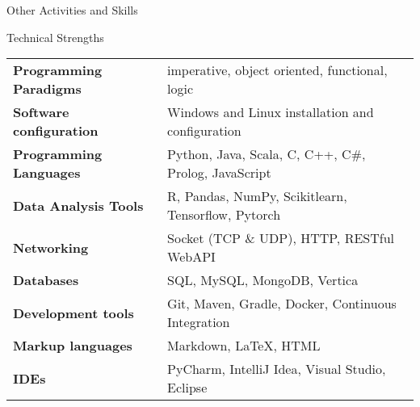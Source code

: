 \documentclass{resume} %
\begin{document}
\begin{rSection}{Other Activities and Skills}
        \begin{rNoListSubsection}{Technical Strengths}{}{}{}
            \begin{tabular}{ @{} >{\bfseries}l @{\hspace{6ex}} l }
                Programming Paradigms	& imperative, object oriented, functional, logic\\
                Software configuration 	& Windows and Linux installation and configuration\\
                Programming Languages 	& Python, Java, Scala, C, C++, C\#, Prolog, JavaScript\\
                Data Analysis Tools		& R, Pandas, NumPy, Scikitlearn, Tensorflow, Pytorch\\
                Networking 				& Socket (TCP \& UDP), HTTP, RESTful WebAPI \\
                Databases 				& SQL, MySQL, MongoDB, Vertica \\
                Development tools 		& Git, Maven, Gradle, Docker, Continuous Integration \\
                Markup languages 		& Markdown, \LaTeX, HTML\\
                IDEs 					& PyCharm, IntelliJ Idea, Visual Studio, Eclipse
            \end{tabular}
        \end{rNoListSubsection}



    \end{rSection}
    
\end{document}
